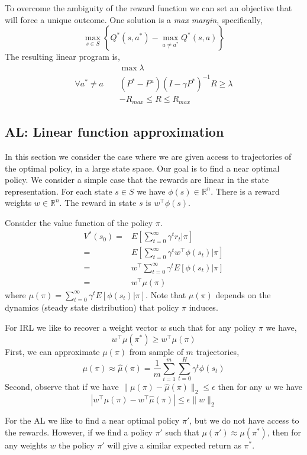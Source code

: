 To overcome the ambiguity of the reward function we can set an
objective that will force a unique outcome. One solution is a {\em
max margin}, specifically,
\[
\max_{s\in S} \left\{ Q^*(s,a^*)-\max_{a\neq a^*} Q^*(s,a) \right\}
\]
The resulting linear program is,\\
\begin{align*}
&\max \lambda\\
\forall a^*\neq a\;\;\;\; & (P^*-P^a) (I-\gamma P^*)^{-1}R\geq \lambda  \\
&-R_{max}\leq R\leq R_{max}
\end{align*}


\subsection{AL: Linear function approximation}

In this section we consider the case where we are given access to
trajectories of the optimal policy, in a large state space. Our goal
is to find a near optimal policy.
%
We consider a  simple case that the rewards are linear in the state
representation. For each state $s\in S$ we have
$\phi(s)\in\mathbb{R}^n$. There is a reward weights
$w\in\mathbb{R}^n$. The reward in state $s$ is $w^\top \phi(s)$.

Consider the value function of the policy $\pi$.
\begin{align*}
V^*(s_0) =& E[\sum_{t=0}^\infty \gamma^t r_t|\pi]\\
 =& E[\sum_{t=0}^\infty \gamma^t w^\top \phi(s_t)|\pi]\\
 =& w^\top  \sum_{t=0}^\infty \gamma^tE[ \phi(s_t)|\pi]\\
 =& w^\top \mu(\pi)
\end{align*}
where $\mu(\pi)=\sum_{t=0}^\infty \gamma^tE[ \phi(s_t)|\pi]$. Note
that $\mu(\pi)$ depends on the dynamics (steady state distribution)
that policy $\pi$ induces.

For IRL we like to recover a weight vector $w$ such that for any
policy $\pi$ we have,
\[
w^\top \mu(\pi^*)\geq w^\top \mu(\pi)
\]
First, we can approximate $\mu(\pi)$ from sample of $m$
trajectories,
\[
\mu(\pi)\approx \hat{\mu}(\pi)=\frac{1}{m}\sum_{i=1}^m \sum_{t=0}^H
\gamma^t \phi(s_t)
\]
Second, observe that if we have $\|\mu(\pi)-\hat{\mu}(\pi)\|_2\leq
\epsilon$ then for any $w$ we have
\[
|w^\top \mu(\pi)-w^\top\hat{\mu}(\pi)|\leq \epsilon \|w\|_2
\]

For the AL we like to find a near optimal policy $\pi'$, but we do
not have access to the rewards. However, if we find a policy $\pi'$
such that $\mu(\pi')\approx\mu(\pi^*)$, then for any weights $w$ the
policy $\pi'$ will give a similar expected return as $\pi^*$.

